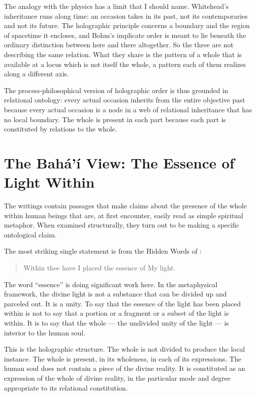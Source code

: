 The analogy with the physics has a limit that I should name.
Whitehead's inheritance runs along time: an occasion takes in its past, not its contemporaries and not its future.
The holographic principle concerns a boundary and the region of spacetime it encloses, and Bohm's implicate order is meant to lie beneath the ordinary distinction between here and there altogether.
So the three are not describing the same relation.
What they share is the pattern of a whole that is available at a locus which is not itself the whole, a pattern each of them realizes along a different axis.

The process-philosophical version of holographic order is thus grounded in relational ontology: every actual occasion inherits from the entire objective past because every actual occasion is a node in a web of relational inheritance that has no local boundary.
The whole is present in each part because each part is constituted by relations to the whole.

\section{The Bahá'í View: The Essence of Light Within}
\label{sec:ch11-bahai}

The \bahai writings contain passages that make claims about the presence of the whole within human beings that are, at first encounter, easily read as simple spiritual metaphor.
When examined structurally, they turn out to be making a specific ontological claim.

The most striking single statement is from the Hidden Words of \Bahaullah:

\begin{quote}
Within thee have I placed the essence of My light.~\citep[Arabic no.~12]{HiddenWords}
\end{quote}

The word ``essence'' is doing significant work here.
In the \bahai metaphysical framework, the divine light is not a substance that can be divided up and parceled out.
It is a unity.
To say that the essence of the light has been placed within is not to say that a portion or a fragment or a subset of the light is within.
It is to say that the whole --- the undivided unity of the light --- is interior to the human soul.

This is the holographic structure.
The whole is not divided to produce the local instance.
The whole is present, in its wholeness, in each of its expressions.
The human soul does not contain a piece of the divine reality.
It is constituted as an expression of the whole of divine reality, in the particular mode and degree appropriate to its relational constitution.

